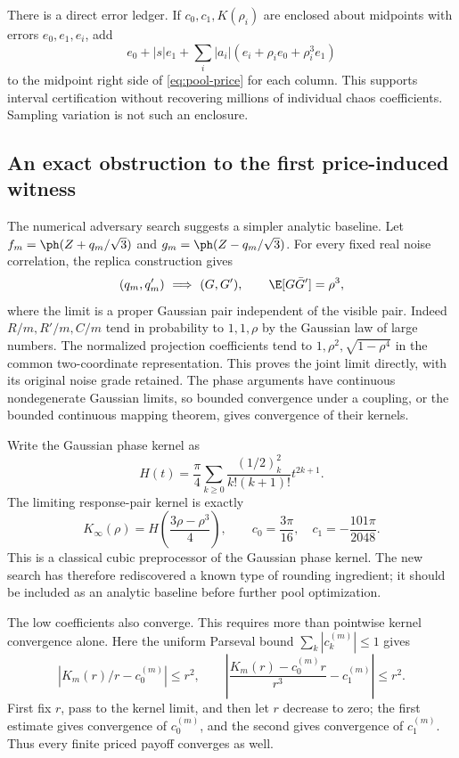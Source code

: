 There is a direct error ledger. If $c_0,c_1,K(\rho_i)$ are enclosed about
midpoints with errors $e_0,e_1,e_i$, add
\[
 e_0+|s|e_1+\sum_i|a_i|(e_i+\rho_i e_0+\rho_i^3e_1)
\]
to the midpoint right side of \eqref{eq:pool-price} for each column. This
supports interval certification without recovering millions of individual
chaos coefficients. Sampling variation is not such an enclosure.

\subsection{An exact obstruction to the first price-induced witness}
The numerical adversary search suggests a simpler analytic baseline.
Let $f_m=\ph(Z+q_m/\sqrt3)$ and $g_m=\ph(Z-q_m/\sqrt3)$.
For every fixed real noise correlation, the replica construction gives
\[
 (q_m,q'_m)\ \Longrightarrow\ (G,G'),\qquad
 \E[G\bar G']=\rho^3,
\]
where the limit is a proper Gaussian pair independent of the visible pair.
Indeed $R/m,R'/m,C/m$ tend in probability to $1,1,\rho$ by the Gaussian law
of large numbers. The normalized projection coefficients tend to
$1,\rho^2,\sqrt{1-\rho^4}$ in the common two-coordinate representation.
This proves the joint limit directly, with its original noise grade retained.
The phase arguments have continuous nondegenerate Gaussian limits, so bounded
convergence under a coupling, or the bounded continuous mapping theorem,
gives convergence of their kernels.

Write the Gaussian phase kernel as
\[
 H(t)=\frac\pi4\sum_{k\ge0}
   \frac{(1/2)_k^2}{k!(k+1)!}t^{2k+1}.
\]
The limiting response-pair kernel is exactly
\[
 K_\infty(\rho)=H\left(\frac{3\rho-\rho^3}{4}\right),\qquad
 c_0=\frac{3\pi}{16},\quad c_1=-\frac{101\pi}{2048}.
\]
This is a classical cubic preprocessor of the Gaussian phase kernel. The
new search has therefore rediscovered a known type of rounding ingredient;
it should be included as an analytic baseline before further pool optimization.

The low coefficients also converge. This requires more than pointwise kernel
convergence alone. Here the uniform Parseval bound $\sum_k|c_k^{(m)}|\le1$
gives
\[
 |K_m(r)/r-c_0^{(m)}|\le r^2,\qquad
 \left|\frac{K_m(r)-c_0^{(m)}r}{r^3}-c_1^{(m)}\right|\le r^2.
\]
First fix $r$, pass to the kernel limit, and then let $r$ decrease to zero;
the first estimate gives convergence of $c_0^{(m)}$, and the second gives
convergence of $c_1^{(m)}$. Thus every finite priced payoff converges as well.

